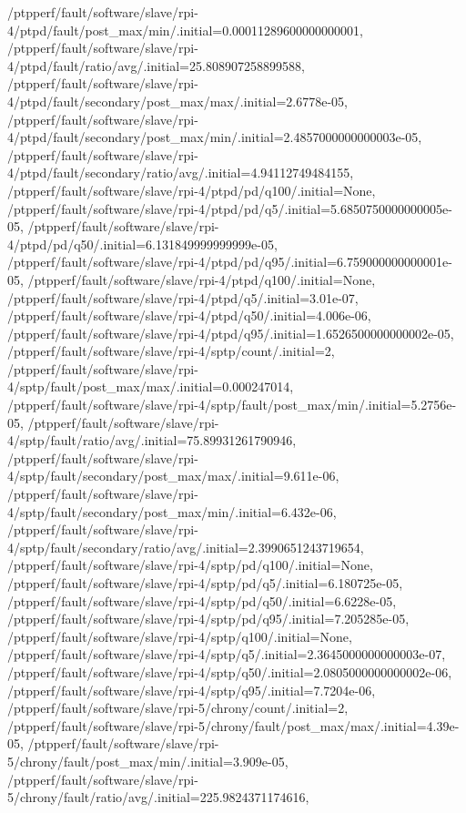 {    /ptpperf/fault/software/slave/rpi-4/ptpd/fault/post_max/min/.initial=0.00011289600000000001,
    /ptpperf/fault/software/slave/rpi-4/ptpd/fault/ratio/avg/.initial=25.808907258899588,
    /ptpperf/fault/software/slave/rpi-4/ptpd/fault/secondary/post_max/max/.initial=2.6778e-05,
    /ptpperf/fault/software/slave/rpi-4/ptpd/fault/secondary/post_max/min/.initial=2.4857000000000003e-05,
    /ptpperf/fault/software/slave/rpi-4/ptpd/fault/secondary/ratio/avg/.initial=4.94112749484155,
    /ptpperf/fault/software/slave/rpi-4/ptpd/pd/q100/.initial=None,
    /ptpperf/fault/software/slave/rpi-4/ptpd/pd/q5/.initial=5.6850750000000005e-05,
    /ptpperf/fault/software/slave/rpi-4/ptpd/pd/q50/.initial=6.131849999999999e-05,
    /ptpperf/fault/software/slave/rpi-4/ptpd/pd/q95/.initial=6.759000000000001e-05,
    /ptpperf/fault/software/slave/rpi-4/ptpd/q100/.initial=None,
    /ptpperf/fault/software/slave/rpi-4/ptpd/q5/.initial=3.01e-07,
    /ptpperf/fault/software/slave/rpi-4/ptpd/q50/.initial=4.006e-06,
    /ptpperf/fault/software/slave/rpi-4/ptpd/q95/.initial=1.6526500000000002e-05,
    /ptpperf/fault/software/slave/rpi-4/sptp/count/.initial=2,
    /ptpperf/fault/software/slave/rpi-4/sptp/fault/post_max/max/.initial=0.000247014,
    /ptpperf/fault/software/slave/rpi-4/sptp/fault/post_max/min/.initial=5.2756e-05,
    /ptpperf/fault/software/slave/rpi-4/sptp/fault/ratio/avg/.initial=75.89931261790946,
    /ptpperf/fault/software/slave/rpi-4/sptp/fault/secondary/post_max/max/.initial=9.611e-06,
    /ptpperf/fault/software/slave/rpi-4/sptp/fault/secondary/post_max/min/.initial=6.432e-06,
    /ptpperf/fault/software/slave/rpi-4/sptp/fault/secondary/ratio/avg/.initial=2.3990651243719654,
    /ptpperf/fault/software/slave/rpi-4/sptp/pd/q100/.initial=None,
    /ptpperf/fault/software/slave/rpi-4/sptp/pd/q5/.initial=6.180725e-05,
    /ptpperf/fault/software/slave/rpi-4/sptp/pd/q50/.initial=6.6228e-05,
    /ptpperf/fault/software/slave/rpi-4/sptp/pd/q95/.initial=7.205285e-05,
    /ptpperf/fault/software/slave/rpi-4/sptp/q100/.initial=None,
    /ptpperf/fault/software/slave/rpi-4/sptp/q5/.initial=2.3645000000000003e-07,
    /ptpperf/fault/software/slave/rpi-4/sptp/q50/.initial=2.0805000000000002e-06,
    /ptpperf/fault/software/slave/rpi-4/sptp/q95/.initial=7.7204e-06,
    /ptpperf/fault/software/slave/rpi-5/chrony/count/.initial=2,
    /ptpperf/fault/software/slave/rpi-5/chrony/fault/post_max/max/.initial=4.39e-05,
    /ptpperf/fault/software/slave/rpi-5/chrony/fault/post_max/min/.initial=3.909e-05,
    /ptpperf/fault/software/slave/rpi-5/chrony/fault/ratio/avg/.initial=225.9824371174616,
}
